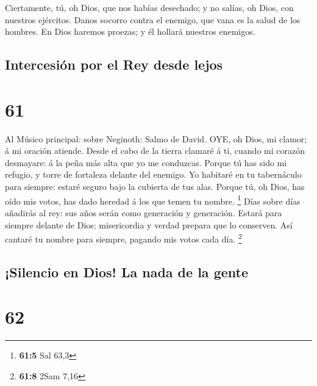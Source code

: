  Ciertamente, tú, oh Dios, que nos habías desechado; y no
salías, oh Dios, con nuestros ejércitos.  Danos socorro
contra el enemigo, que vana es la salud de los hombres.  En
Dios haremos proezas; y él hollará nuestros enemigos.

\hypertarget{intercesiuxf3n-por-el-rey-desde-lejos}{%
\subsection{Intercesión por el Rey desde
lejos}\label{intercesiuxf3n-por-el-rey-desde-lejos}}

\hypertarget{section-60}{%
\section{61}\label{section-60}}

 Al Músico principal: sobre Neginoth: Salmo de David. OYE,
oh Dios, mi clamor; á mi oración atiende.  Desde el cabo de
la tierra clamaré á ti, cuando mi corazón desmayare: á la peña más alta
que yo me conduzcas.  Porque tú has sido mi refugio, y torre
de fortaleza delante del enemigo.  Yo habitaré en tu
tabernáculo para siempre: estaré seguro bajo la cubierta de tus alas.
 Porque tú, oh Dios, has oído mis votos, has dado heredad á
los que temen tu nombre. \footnote{\textbf{61:5} Sal 63,3} 
Días sobre días añadirás al rey: sus años serán como generación y
generación.  Estará para siempre delante de Dios:
misericordia y verdad prepara que lo conserven.  Así cantaré
tu nombre para siempre, pagando mis votos cada día. \footnote{\textbf{61:8}
  2Sam 7,16}

\hypertarget{silencio-en-dios-la-nada-de-la-gente}{%
\subsection{¡Silencio en Dios! La nada de la
gente}\label{silencio-en-dios-la-nada-de-la-gente}}

\hypertarget{section-61}{%
\section{62}\label{section-61}}

